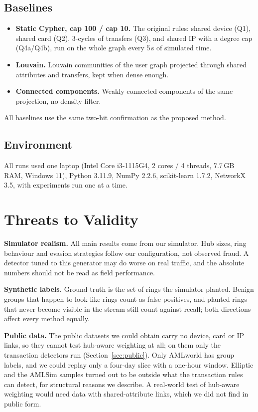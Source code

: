 \subsection{Baselines}
\begin{itemize}
\item \textbf{Static Cypher, cap 100 / cap 10.} The original rules: shared
device (Q1), shared card (Q2), 3-cycles of transfers (Q3), and shared IP with a
degree cap (Q4a/Q4b), run on the whole graph every 5\,s of simulated time.
\item \textbf{Louvain.} Louvain communities \cite{li2023dplouvain} of the
user graph projected through shared attributes and transfers, kept when dense
enough.
\item \textbf{Connected components.} Weakly connected components of the same
projection, no density filter.
\end{itemize}
All baselines use the same two-hit confirmation as the proposed method.

\subsection{Environment}
All runs used one laptop (Intel Core i3-1115G4, 2 cores / 4 threads, 7.7\,GB
RAM, Windows 11), Python 3.11.9, NumPy 2.2.6, scikit-learn 1.7.2,
NetworkX 3.5, with experiments run one at a time.



\section{Threats to Validity}
\label{sec:threats}
\textbf{Simulator realism.} All main results come from our simulator. Hub
sizes, ring behaviour and evasion strategies follow our configuration, not
observed fraud. A detector tuned to this generator may do worse on real
traffic, and the absolute numbers should not be read as field performance.

\textbf{Synthetic labels.} Ground truth is the set of rings the simulator
planted. Benign groups that happen to look like rings count as false
positives, and planted rings that never become visible in the stream still
count against recall; both directions affect every method equally.

\textbf{Public data.} The public datasets we could obtain carry no device,
card or IP links, so they cannot test hub-aware weighting at all; on them only
the transaction detectors run (Section~\ref{sec:public}). Only AMLworld has
group labels, and we could replay only a four-day slice with a one-hour window.
Elliptic and the AMLSim samples turned out to be outside what the transaction
rules can detect, for structural reasons we describe. A real-world test of
hub-aware weighting would need data with shared-attribute links, which we did
not find in public form.

